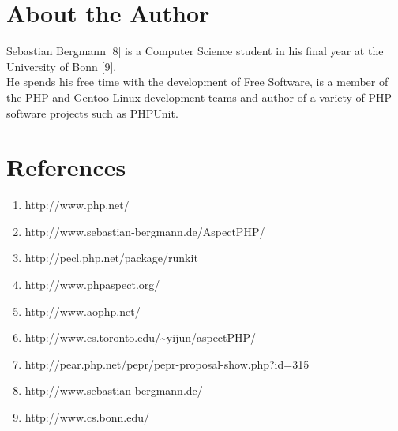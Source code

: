\documentclass[portrait,a0]{a0poster}
\begin{document}
\begin{poster}
\begin{pcolumn}
\begin{pbox}
\begin{itemize}
  \end{itemize}

\section{About the Author}
Sebastian Bergmann [8] is a Computer Science student in his final year at the University of Bonn [9].\\
He spends his free time with the development of Free Software, is a member of the PHP and Gentoo Linux development teams and author of a variety of PHP software projects such as PHPUnit.

\section{References}
\normalsize
\begin{enumerate}
  \item http://www.php.net/
  \item http://www.sebastian-bergmann.de/AspectPHP/
  \item http://pecl.php.net/package/runkit
  \item http://www.phpaspect.org/
  \item http://www.aophp.net/
  \item http://www.cs.toronto.edu/\textasciitilde yijun/aspectPHP/
  \item http://pear.php.net/pepr/pepr-proposal-show.php?id=315
  \item http://www.sebastian-bergmann.de/
  \item http://www.cs.bonn.edu/
\end{enumerate}
\end{pbox}
\end{pcolumn}
\end{poster}
\end{document}
